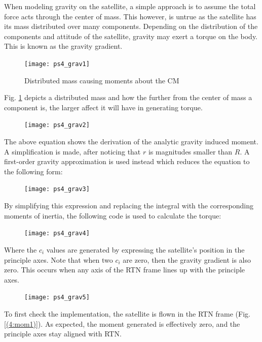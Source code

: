 \documentclass[12pt, letterpaper]{article}
\begin{document}
When modeling gravity on the satellite, a simple approach is to assume the total force acts through the center of mass. This however, is untrue as the satellite has its mass distributed over many components. Depending on the distribution of the components and attitude of the satellite, gravity may exert a torque on the body. This is known as the gravity gradient. 

\begin{figure}[H]
	\centering
	\texttt{[image: ps4\_grav1]}
	\caption{Distributed mass causing moments about the CM}
	\label{4:grav1}
\end{figure}

Fig. \ref{4:grav1} depicts a distributed mass and how the further from the center of mass a component is, the larger affect it will have in generating torque.

\begin{figure}[H]
	\centering
	\texttt{[image: ps4\_grav2]}
\end{figure}

The above equation shows the derivation of the analytic gravity induced moment. A simplification is made, after noticing that $r$ is magnitudes smaller than $R$. A first-order gravity approximation is used instead which reduces the equation to the following form:

\begin{figure}[H]
	\centering
	\texttt{[image: ps4\_grav3]}
\end{figure}

By simplifying this expression and replacing the integral with the corresponding moments of inertia, the following code is used to calculate the torque:

\begin{figure}[H]
	\centering
	\texttt{[image: ps4\_grav4]}
\end{figure}

Where the $c_i$ values are generated by expressing the satellite's position in the principle axes. Note that when two $c_i$ are zero, then the gravity gradient is also zero. This occurs when any axis of the RTN frame lines up with the principle axes.

\begin{figure}[H]
	\centering
	\texttt{[image: ps4\_grav5]}
\end{figure}

To first check the implementation, the satellite is flown in the RTN frame (Fig. \ref{(4:mom1)}). As expected, the moment generated is effectively zero, and the principle axes stay aligned with RTN.
\end{document}
